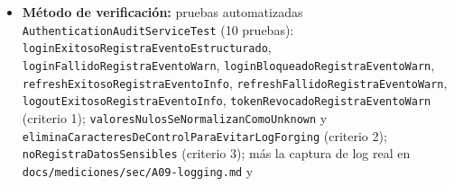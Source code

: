 \documentclass[
  spanish,
]{article}
\providecommand{\tightlist}{%
  \setlength{\itemsep}{0pt}\setlength{\parskip}{0pt}}
\begin{document}
\begin{itemize}
  \begin{enumerate}
  \def\labelenumi{\arabic{enumi}.}
  \tightlist
  \item
    Dado un evento de autenticación (login exitoso, login fallido,
    bloqueo por rate limit, refresh exitoso, refresh fallido, logout,
    uso de token revocado), cuando ocurre, entonces se emite una línea
    de log estructurada con prefijo \texttt{AUTH\_\allowbreak{}AUDIT}, el tipo de
    evento, la IP, la marca de tiempo UTC y el sujeto.
  \item
    Los valores nulos se normalizan a \texttt{unknown} y los caracteres
    de control se eliminan del mensaje, de modo que un sujeto manipulado
    no pueda inyectar líneas de log falsas (\emph{log forging}).
  \item
    La línea de log no contiene contraseñas, hashes ni tokens.
  \item
    Dada una operación de creación, actualización o baja sobre mascotas,
    citas, consultas, vacunas o usuarios, cuando se ejecuta, entonces se
    registra un evento de auditoría con sujeto, marca de tiempo, IP,
    recurso afectado y resultado.
  \end{enumerate}
\item
  \textbf{Método de verificación:} pruebas automatizadas
  \texttt{Authentication\allowbreak{}Audit\allowbreak{}Service\allowbreak{}Test} (10 pruebas):
  \texttt{login\allowbreak{}Exitoso\allowbreak{}Registra\allowbreak{}Evento\allowbreak{}Estructurado},
  \texttt{login\allowbreak{}Fallido\allowbreak{}Registra\allowbreak{}Evento\allowbreak{}Warn},
  \texttt{login\allowbreak{}Bloqueado\allowbreak{}Registra\allowbreak{}Evento\allowbreak{}Warn},
  \texttt{refresh\allowbreak{}Exitoso\allowbreak{}Registra\allowbreak{}Evento\allowbreak{}Info},
  \texttt{refresh\allowbreak{}Fallido\allowbreak{}Registra\allowbreak{}Evento\allowbreak{}Warn},
  \texttt{logout\allowbreak{}Exitoso\allowbreak{}Registra\allowbreak{}Evento\allowbreak{}Info},
  \texttt{token\allowbreak{}Revocado\allowbreak{}Registra\allowbreak{}Evento\allowbreak{}Warn} (criterio 1);
  \texttt{valores\allowbreak{}Nulos\allowbreak{}Se\allowbreak{}Normalizan\allowbreak{}Como\allowbreak{}Unknown} y
  \texttt{elimina\allowbreak{}Caracteres\allowbreak{}De\allowbreak{}Control\allowbreak{}Para\allowbreak{}Evitar\allowbreak{}Log\allowbreak{}Forging} (criterio 2);
  \texttt{no\allowbreak{}Registra\allowbreak{}Datos\allowbreak{}Sensibles} (criterio 3); más la captura de log
  real en \texttt{docs/\allowbreak{}mediciones/\allowbreak{}sec/\allowbreak{}A09-\allowbreak{}logging.\allowbreak{}md} y

\end{itemize}
\end{document}
